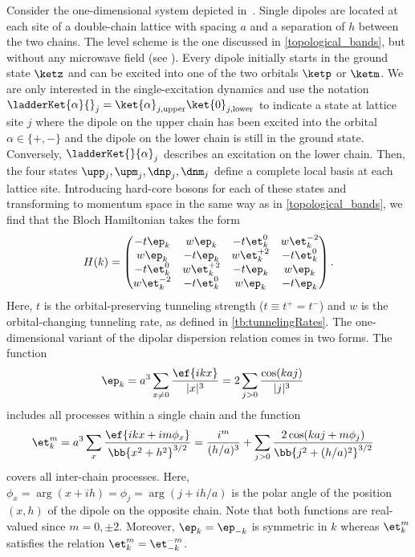 Consider the one-dimensional system depicted in~.
Single dipoles are located at each site of a double-chain lattice with spacing $a$ and a separation of $h$ between the two chains.
The level scheme is the one discussed in \cref{topological_bands}, but without any microwave field (see ). Every dipole initially starts in the ground state $\ketz$ and can be excited into one of the two orbitals $\ketp$ or $\ketm$.
We are only interested in the single-excitation dynamics and use the notation $\ladderKet{\alpha}{}_j = \ket{\alpha}_{j,\text{upper}} \ket{0}_{j,\text{lower}}$ to indicate a state at lattice site $j$ where the dipole on the upper chain has been excited into the orbital $\alpha \in \{+, -\}$ and the dipole on the lower chain is still in the ground state.
Conversely, $\ladderKet{}{\alpha}_j$ describes an excitation on the lower chain.
Then, the four states $\upp_j, \upm_j, \dnp_j, \dnm_j$ define a complete local basis at each lattice site.
Introducing hard-core bosons for each of these states and transforming to momentum space in the same way as in \cref{topological_bands}, we find that the Bloch Hamiltonian takes the form
\begin{align}
    H(k) =
    \begin{pmatrix}
        -t \ep_k  & w \ep_k & -t \et^0_k & w \et^{-2}_k \\
        w \ep_k & -t \ep_k  & w \et^{+2}_k & -t \et^0_k \\
        -t \et^0_{k} & w \et^{+2}_{k}  & -t \ep_k  & w \ep_k \\
        w \et^{-2}_{k} & -t \et^0_{k} & w \ep_k & -t \ep_k
    \end{pmatrix}.
\end{align}
Here, $t$ is the orbital-preserving tunneling strength ($t \equiv t^+ = t^-$) and $w$ is the orbital-changing tunneling rate, as defined in \cref{tb:tunnelingRates}.
The one-dimensional variant of the dipolar dispersion relation comes in two forms. The function
\begin{align}
    \ep_k &= a^3 \sum_{x\ne 0} \frac{\ef{i k x}}{|x|^3} = 2 \sum_{j>0} \frac{\cos(k a j)}{|j|^3}
\end{align}
includes all processes within a single chain and the function
\begin{align}
    \et^m_k &= a^3 \sum_{x} \frac{\ef{i k x + i m \phi_x}}{\bb{x^2 + h^2}^{3/2}}
    = \frac{i^m}{(h/a)^3} + \sum_{j>0} \frac{2\cos(ka j+m\phi_j)}{\bb{j^2+(h/a)^2}^{3/2}}
\end{align}
covers all inter-chain processes. Here, $\phi_x = \arg(x+ i h)=\phi_j=\arg(j+ i h/a)$ is the polar angle of the position $(x, h)$ of the dipole on the opposite chain.
Note that both functions are real-valued since $m = 0, \pm 2$. Moreover, $\ep_k=\ep_{-k}$ is symmetric in $k$ whereas $\et^m_k$ satisfies the relation $\et^m_k=\et^{-m}_{-k}$.

